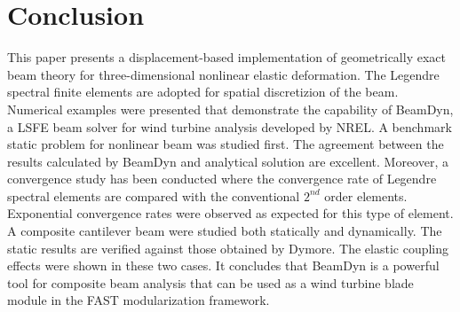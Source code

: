 \section{Conclusion}


This paper presents a displacement-based implementation of geometrically
exact beam theory for three-dimensional nonlinear elastic deformation. The
Legendre spectral finite elements are adopted for spatial discretizion of
the beam. Numerical examples were presented that demonstrate the capability
of BeamDyn, a LSFE beam solver for wind turbine analysis developed by NREL. A benchmark static problem for nonlinear beam was studied first. The agreement between the results calculated by BeamDyn and analytical solution are excellent. Moreover, a convergence study has been conducted where the convergence rate of Legendre spectral elements are compared with the conventional $2^{nd}$ order elements. Exponential convergence rates were observed as expected for this type of element. A composite cantilever beam were studied both statically and dynamically. The static results are verified against those obtained by Dymore. The elastic coupling effects were shown in these two cases. It concludes that BeamDyn is a powerful tool for composite beam analysis that can be used as a wind turbine blade module in the FAST modularization framework.

